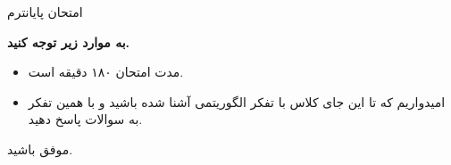 
\usepackage{template/template}
\usepackage{tabularx}
\usepackage{graphicx}
\graphicspath{ {./images/} }


	\def\ci{\perp\!\!\!\perp}

	

	\header
		{امتحان پایانترم}{}{}{}{}
	

	
		\textbf{به موارد زیر توجه کنید.}
		
		\begin{itemize}
			\item مدت امتحان ۱۸۰ دقیقه است.
			\item امیدواریم که تا این جای کلاس با تفکر الگوریتمی آشنا شده باشید و با همین تفکر به سوالات پاسخ دهید.
		\end{itemize}
		
	\begin{enumerate}
		\setlength{\itemsep}{30pt}

		\end{enumerate}
	\begin{flushleft}
			موفق باشید. 
	\end{flushleft}

